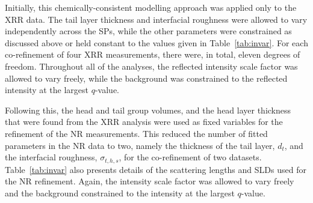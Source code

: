 Initially, this chemically-consistent modelling approach was applied only to the XRR data.
The tail layer thickness and interfacial roughness were allowed to vary independently across the SPs, while the other parameters were constrained as discussed above or held constant to the values given in Table~\ref{tab:invar}.
For each co-refinement of four XRR measurements, there were, in total, eleven degrees of freedom.
Throughout all of the analyses, the reflected intensity scale factor was allowed to vary freely, while the background was constrained to the reflected intensity at the largest $q$-value.

Following this, the head and tail group volumes, and the head layer thickness that were found from the XRR analysis were used as fixed variables for the refinement of the NR measurements.
This reduced the number of fitted parameters in the NR data to two, namely the thickness of the tail layer, $d_t$, and the interfacial roughness, $\sigma_{t,h,s}$, for the co-refinement of two datasets.
Table~\ref{tab:invar} also presents details of the scattering lengths and SLDs used for the NR refinement.
Again, the intensity scale factor was allowed to vary freely and the background constrained to the intensity at the largest $q$-value.


